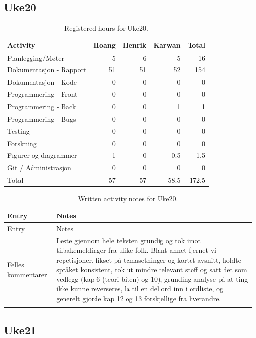 \subsection{Uke20}

\begin{table}[H]
\centering
\small
\caption{Registered hours for Uke20.}
\label{tab:project-hours-uke20}
\begin{tabular}{lrrrr}
\toprule
Activity & Hoang & Henrik & Karwan & Total \\
\midrule
Planlegging/Møter & 5 & 6 & 5 & 16 \\
Dokumentasjon - Rapport & 51 & 51 & 52 & 154 \\
Dokumentasjon - Kode & 0 & 0 & 0 & 0 \\
Programmering - Front & 0 & 0 & 0 & 0 \\
Programmering - Back & 0 & 0 & 1 & 1 \\
Programmering - Bugs & 0 & 0 & 0 & 0 \\
Testing & 0 & 0 & 0 & 0 \\
Forskning & 0 & 0 & 0 & 0 \\
Figurer og diagrammer & 1 & 0 & 0.5 & 1.5 \\
Git / Administrasjon & 0 & 0 & 0 & 0 \\
\midrule
Total & 57 & 57 & 58.5 & 172.5 \\
\bottomrule
\end{tabular}
\end{table}

\begin{longtable}{p{}p{}}
\caption{Written activity notes for Uke20.}\\
\toprule
Entry & Notes \\
\midrule
\endfirsthead
\toprule
Entry & Notes \\
\midrule
\endhead
Felles kommentarer & Leste gjennom hele teksten grundig og tok imot tilbakemeldinger fra ulike folk. Blant annet fjernet vi repetisjoner, fikset på temasetninger og kortet avsnitt, holdte språket konsistent, tok ut mindre relevant stoff og satt det som vedlegg (kap 6 (teori biten) og 10), grunding analyse på at ting ikke kunne reverseres, la til en del ord inn i ordliste, og generelt gjorde kap 12 og 13 forskjellige fra hverandre. \\
\addlinespace
\bottomrule
\end{longtable}

\subsection{Uke21}

